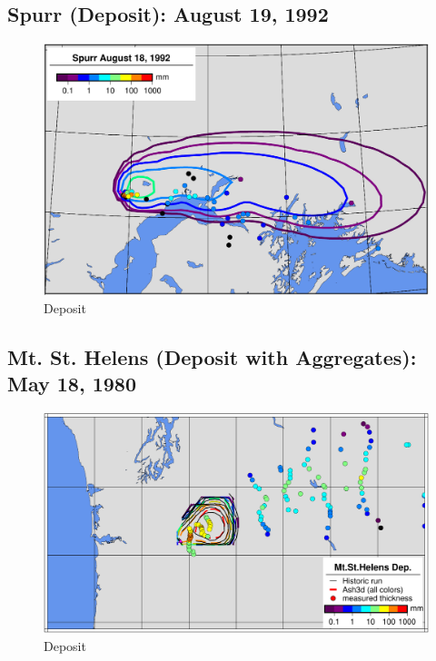 \subsection{Spurr (Deposit): August 19, 1992}
\begin{figure}[htbp]
\includegraphics[angle=0,scale=0.6]{Figures/TestCase_Results/ValidTest/Spurr_Deposit.pdf}
\parbox{15cm}{\caption{\label{FigTestValSpurr} Deposit}}
\end{figure}

\clearpage
\subsection{Mt. St. Helens (Deposit with Aggregates): May 18, 1980}
\begin{figure}[htbp]
\includegraphics[angle=0,scale=0.6]{Figures/TestCase_Results/ValidTest/MSH_Deposit.pdf}
\parbox{15cm}{\caption{\label{FigTestValMSH} Deposit}}
\end{figure}

\clearpage
